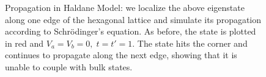 \documentclass[a4paper]{article}
\begin{document}
\begin{figure}
%
%

%
%
\caption{Propagation in Haldane Model: we localize the above eigenstate along one edge of the hexagonal lattice and simulate its propagation according to Schr{\"o}dinger's equation.
As before, the state is plotted in red and $V_a = V_b = 0,\; t = t' = 1$.
The state hits the corner and continues to propagate along the next edge, showing that it is unable to couple with bulk states.
}%
\label{fig:haldane_prop}%
\end{figure}
\end{document}
